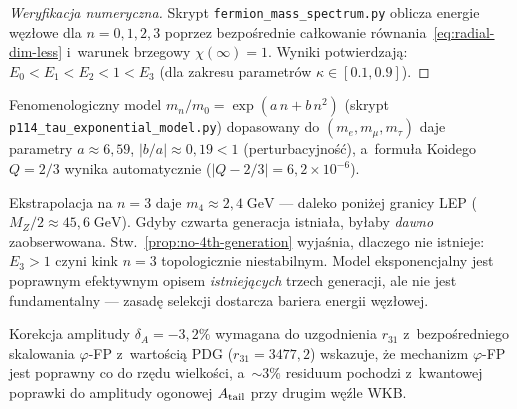 \begin{proof}[Weryfikacja numeryczna]
Skrypt \texttt{fermion\_mass\_spectrum.py} oblicza energie
w\k{e}z\l{}owe dla $n = 0, 1, 2, 3$ poprzez bezpo\'srednie
ca\l{}kowanie r\'ownania~\eqref{eq:radial-dim-less}
i~warunek brzegowy $\chi(\infty) = 1$.
Wyniki potwierdzaj\k{a}:
$E_0 < E_1 < E_2 < 1 < E_3$
(dla zakresu parametr\'ow $\kappa \in [0.1, 0.9]$).
\end{proof}

\begin{remark}%
\label{rem:exponential-vs-cutoff}
Fenomenologiczny model $m_n/m_0 = \exp(a\,n + b\,n^2)$
(skrypt \texttt{p114\_tau\_exponential\_model.py})
dopasowany do $(m_e, m_\mu, m_\tau)$ daje parametry
$a \approx 6{,}59$, $|b/a| \approx 0{,}19 < 1$ (perturbacyjno\'s\'c),
a~formu\l{}a Koidego~\cite{Koide2007} $Q = 2/3$ wynika automatycznie
($|Q - 2/3| = 6{,}2 \times 10^{-6}$).

Ekstrapolacja na $n = 3$ daje $m_4 \approx 2{,}4\;\mathrm{GeV}$
--- daleko poni\.zej granicy LEP ($M_Z/2 \approx 45{,}6\;\mathrm{GeV}$).
Gdyby czwarta generacja istnia\l{}a, by\l{}aby \emph{dawno} zaobserwowana.
Stw.~\ref{prop:no-4th-generation} wyja\'snia, dlaczego nie istnieje:
$E_3 > 1$ czyni kink $n = 3$ topologicznie niestabilnym.
Model eksponencjalny jest poprawnym efektywnym opisem
\emph{istniej\k{a}cych} trzech generacji, ale nie jest fundamentalny
--- zasad\k{e} selekcji dostarcza bariera energii w\k{e}z\l{}owej.

Korekcja amplitudy $\delta_A = -3{,}2\%$ wymagana do uzgodnienia
$r_{31}$ z~bezpo\'sredniego skalowania $\varphi$-FP
z~warto\'sci\k{a} PDG ($r_{31} = 3477{,}2$) wskazuje,
\.ze mechanizm $\varphi$-FP jest poprawny co do rz\k{e}du wielko\'sci,
a~$\sim 3\%$ residuum pochodzi z~kwantowej poprawki
do amplitudy ogonowej $A_{\rm tail}$ przy drugim w\k{e}\'zle WKB.
\end{remark}

